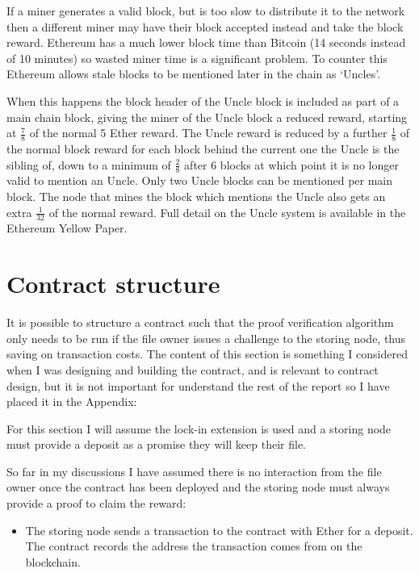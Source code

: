 \documentclass[12pt,a4paper,twoside,openright]{report}
\begin{document}
\begin{appendices}
If a miner generates a valid block, but is too slow to distribute it to the network then a different miner may
have their block accepted instead and take the block reward.
Ethereum has a much lower block time than Bitcoin (14 seconds instead of 10 minutes) so wasted miner time is a significant problem.
To counter this Ethereum allows stale blocks to be mentioned later in the chain as `Uncles'.

When this happens the block header of the Uncle block is included as part of a main chain block, giving the miner of the Uncle block a reduced reward,
starting at $\frac{7}{8}$ of the normal 5 Ether reward.
The Uncle reward is reduced by a further $\frac{1}{8}$ of the normal block reward for each
block behind the current one the Uncle is the sibling of, down to a minimum of $\frac{2}{8}$ after 6 blocks
at which point it is no longer valid to mention an Uncle.
Only two Uncle blocks can be mentioned per main block.
The node that mines the block which mentions the Uncle also gets an extra $\frac{1}{32}$ of the normal reward.
Full detail on the Uncle system is available in the Ethereum Yellow Paper\cite{eth-yellowpaper}.





\chapter{Contract structure}\label{app-challenge}

It is possible to structure a contract such that the proof verification algorithm only needs to be run if the file owner issues a challenge to the storing node,
thus saving on transaction costs.
The content of this section is something I considered when I was designing and building the contract, and is relevant to contract design, but it is not important for
understand the rest of the report so I have placed it in the Appendix:

For this section I will assume the lock-in extension is used and a storing node must provide a deposit as a promise they will keep their file.

So far in my discussions I have assumed there is no interaction from the file owner once the contract has been deployed
and the storing node must always provide a proof to claim the reward:
\begin{itemize}
\item The storing node sends a transaction to the contract with Ether for a deposit.
The contract records the address the transaction comes from on the blockchain.


\end{itemize}
\end{appendices}
\end{document}

